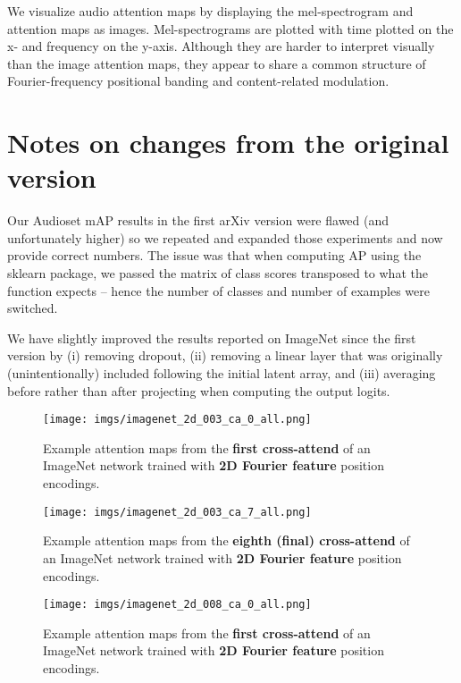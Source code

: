 \documentclass{article}
\begin{document}
We visualize audio attention maps by displaying the mel-spectrogram and attention maps as images. Mel-spectrograms are plotted with time plotted on the x- and frequency on the y-axis. Although they are harder to interpret visually than the image attention maps, they appear to share a common structure of Fourier-frequency positional banding and content-related modulation.

\section{Notes on changes from the original version}

Our Audioset mAP results in the first arXiv version were flawed (and unfortunately higher) so we repeated and expanded those experiments and now provide correct numbers. The issue was that when computing AP using the sklearn package, we passed the matrix of class scores transposed to what the function expects -- hence the number of classes and number of examples were switched.

We have slightly improved the results reported on ImageNet since the first version by (i) removing dropout, (ii) removing a linear layer that was originally (unintentionally) included following the initial latent array, and (iii) averaging before rather than after projecting when computing the output logits.

\begin{figure*}
    \centering
    \texttt{[image: imgs/imagenet\_2d\_003\_ca\_0\_all.png]}
    \vspace{-12pt}
    \caption{Example attention maps from the \textbf{first cross-attend} of an ImageNet network trained with \textbf{2D Fourier feature} position encodings.}
\end{figure*}

\begin{figure*}
    \centering
    \texttt{[image: imgs/imagenet\_2d\_003\_ca\_7\_all.png]}
    \vspace{-12pt}
    \caption{Example attention maps from the \textbf{eighth (final) cross-attend} of an ImageNet network trained with \textbf{2D Fourier feature} position encodings.}
\end{figure*}

\begin{figure*}
    \centering
    \texttt{[image: imgs/imagenet\_2d\_008\_ca\_0\_all.png]}
    \vspace{-12pt}
    \caption{Example attention maps from the \textbf{first cross-attend} of an ImageNet network trained with \textbf{2D Fourier feature} position encodings.}
\end{figure*}
\end{document}

